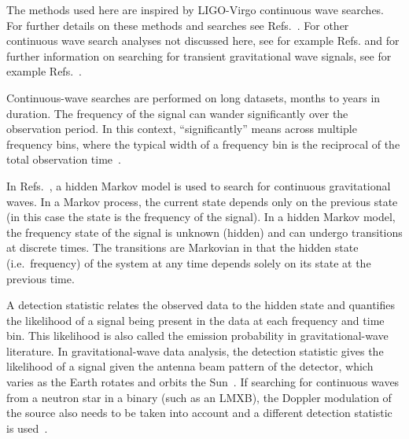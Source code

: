 \documentclass[paper-main.tex]{subfiles}
\begin{document}

The methods used here are  inspired by LIGO-Virgo continuous wave searches. 
For further details on these methods and searches see Refs.~\cite{SuvorovaEtAl:2016, SuvorovaEtAl:2017, ScoX1O2Viterbi:2019, ScoX1ViterbiO1:2017, BeniwalEtAl:2021, MillhouseStrangMelatos:2020, JonesSun:2020, MiddletonEtAlO2LMXBs:2020, PostMergerRemnantSearch:2019, BayleyEtAlSOAP:2019, SunEtAlSNR:2018}.
For other continuous wave search analyses not discussed here, see for example Refs.\cite{UnknownNSSearchO3a:2021, EinsteinAtHomeO2:2021, MSPSearchO3O2O1:2020, RadiometerO1O2:2019, SearchCrossCorrO1:2017, SearchTwoSpecS6:2017, VirgoCrabVelaSearch:2015, StackSlide:2012} and for further information on searching for transient gravitational wave signals, see for example Refs.~\cite{MillhouseEtAl:2018, Mohanty:2017, AddessoEtAl:2016, ThraneCoughlin:2014, ThraneEtAl:2011, CandesEtAl:2008, ChassandeMottinArchana:2006, AndersonBalasubramanian:1999}.


Continuous-wave searches are performed on long datasets, months to years in duration. 
The frequency of the signal can wander significantly over the observation period. 
In this context, ``significantly'' means across multiple frequency bins, where the typical width of a frequency bin is the reciprocal of the total observation time~\cite{JKS:1998,ScoX1O2Viterbi:2019}.


In Refs.~\cite{SuvorovaEtAl:2016,SuvorovaEtAl:2017}, a hidden Markov model is used to search for continuous gravitational waves. 
In a Markov process, the current state depends only on the previous state (in this case the state is the frequency of the signal). 
In a hidden Markov model, the frequency state of the signal is unknown (hidden) and can undergo transitions at discrete times. 
The transitions are Markovian in that the hidden state (i.e.\ frequency) of the system at any time depends solely on its state at the previous time. 


A detection statistic relates the observed data to the hidden state and quantifies the likelihood of a signal being present in the data at each frequency and time bin.
This likelihood is also called the emission probability in gravitational-wave literature.  
In gravitational-wave data analysis, the detection statistic gives the likelihood of a signal given the antenna beam pattern of the detector, which varies as the Earth rotates and orbits the Sun~\cite{JKS:1998}.
If searching for continuous waves from a neutron star in a binary (such as an LMXB), the Doppler modulation of the source also needs to be taken into account and a different detection statistic is used~\cite{SuvorovaEtAl:2017}. 
\end{document}

